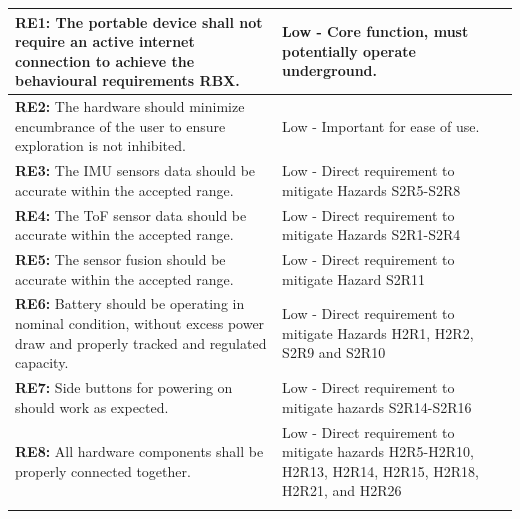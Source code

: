 \documentclass[11pt]{article}
\begin{document}
\begin{tabularx}{\textwidth}{X p{}}
			\toprule
			\textbf{RE1:} The portable device shall not require an active internet connection to achieve the behavioural requirements RBX.  & Low - Core function, must potentially operate underground. \\
			\midrule
			\textbf{RE2:} The hardware should minimize encumbrance of the user to ensure exploration is not inhibited.  & Low - Important for ease of use. \\
            \midrule
            \textbf{RE3:} The IMU sensors data should be accurate within the accepted range. & Low - Direct requirement to mitigate Hazards S2R5-S2R8 \\ 
            \midrule
            \textbf{RE4:} The ToF sensor data should be accurate within the accepted range. & Low - Direct requirement to mitigate Hazards S2R1-S2R4 \\
            \midrule
            \textbf{RE5:} The sensor fusion should be accurate within the accepted range. & Low - Direct requirement to mitigate Hazard S2R11 \\ 
            \midrule
            \textbf{RE6:} Battery should be operating in nominal condition, without excess power draw and properly tracked and regulated capacity. & Low - Direct requirement to mitigate Hazards H2R1, H2R2, S2R9 and S2R10 \\
            \midrule
            \textbf{RE7:} Side buttons for powering on should work as expected. & Low - Direct requirement to mitigate hazards S2R14-S2R16 \\
            \midrule
            \textbf{RE8:} All hardware components shall be properly connected together. & Low - Direct requirement to mitigate hazards H2R5-H2R10, H2R13, H2R14, H2R15, H2R18, H2R21, and H2R26 \\
			\bottomrule
			\caption{Requirement and its Likeliness to Change}
		\end{tabularx}
			
		
\end{document}
